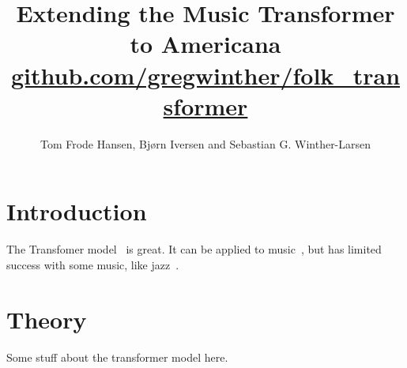 \documentclass{article}
\title{Extending the Music Transformer to Americana \\
    \normalsize{\url{github.com/gregwinther/folk_transformer}}}
\author{Tom Frode Hansen, Bjørn Iversen and Sebastian G. Winther-Larsen}
\begin{document}
    \maketitle

    \section{Introduction}

        The Transfomer model~\cite{vaswani2017attention} is great.
        It can be applied to music~\cite{huang2018music}, but 
        has limited success with some music, like jazz~\cite{wu2020jazz}.

    \section{Theory}

        Some stuff about the transformer model here.

    \printbibliography
\end{document}
